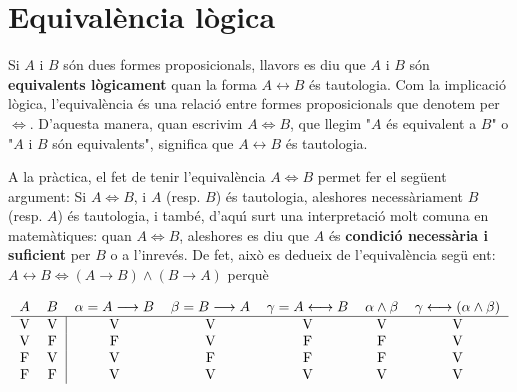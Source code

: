 \section{Equival\`{e}ncia l\`{o}gica\label{2}}

Si $A$ i $B$ s\'{o}n dues formes proposicionals, llavors es diu que $A$ i $B$
s\'{o}n \textbf{equivalents l\`{o}gicament }quan la forma $%
A\longleftrightarrow B$ \'{e}s tautologia. Com la implicaci\'{o} l\`{o}gica,
l'equival\`{e}ncia \'{e}s una relaci\'{o} entre formes proposicionals que
denotem per $\Longleftrightarrow$. D'aquesta manera, quan escrivim $%
A\Longleftrightarrow B$, que llegim "$A$ \'{e}s equivalent a $B$" o "$A$ i $%
B $ s\'{o}n equivalents", significa que $A\longleftrightarrow B$ \'{e}s
tautologia.

A la pr\`{a}ctica, el fet de tenir l'equival\`{e}ncia $A\Longleftrightarrow
B $ permet fer el seg\"{u}ent argument: Si $A\Longleftrightarrow B$, i $A$
(resp. $B$) \'{e}s tautologia, aleshores necess\`{a}riament $B$ (resp. $A$)
\'{e}s tautologia, i tamb\'{e}, d'aqu\'{\i} surt una interpretaci\'{o} molt
comuna en matem\`{a}tiques: quan $A\Longleftrightarrow B$, aleshores es diu
que $A$ \'{e}s \textbf{condici\'{o} necess\`{a}ria i suficient} per $B$ o a
l'inrev\'{e}s. De fet, aix\`{o} es dedueix de l'equival\`{e}ncia seg\"{u}%
ent: $A\longleftrightarrow B\Longleftrightarrow\left( A\longrightarrow
B\right) \wedge\left( B\longrightarrow A\right) $ perqu\`{e}

\begin{equation*}
\begin{tabular}{lllllll}
$A$ & $B$ & $\alpha=A\longrightarrow B$ & $\beta=B\longrightarrow A$ & $%
\gamma=A\longleftrightarrow B$ & $\alpha\wedge\beta$ & $\gamma
\longleftrightarrow\left( \alpha\wedge\beta\right) $ \\ \hline
\multicolumn{1}{c}{V} & \multicolumn{1}{c|}{V} & \multicolumn{1}{c}{V} &
\multicolumn{1}{c}{V} & \multicolumn{1}{c}{V} & \multicolumn{1}{c}{V} &
\multicolumn{1}{c}{V} \\
\multicolumn{1}{c}{V} & \multicolumn{1}{c|}{F} & \multicolumn{1}{c}{F} &
\multicolumn{1}{c}{V} & \multicolumn{1}{c}{F} & \multicolumn{1}{c}{F} &
\multicolumn{1}{c}{V} \\
\multicolumn{1}{c}{F} & \multicolumn{1}{c|}{V} & \multicolumn{1}{c}{V} &
\multicolumn{1}{c}{F} & \multicolumn{1}{c}{F} & \multicolumn{1}{c}{F} &
\multicolumn{1}{c}{V} \\
\multicolumn{1}{c}{F} & \multicolumn{1}{c|}{F} & \multicolumn{1}{c}{V} &
\multicolumn{1}{c}{V} & \multicolumn{1}{c}{V} & \multicolumn{1}{c}{V} &
\multicolumn{1}{c}{V}%
\end{tabular}
\end{equation*}

